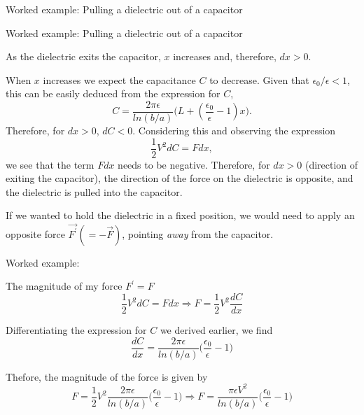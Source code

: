 {\begin{frame}{Worked example: Pulling a dielectric out of a capacitor}
\end{frame}

%
%
%

\begin{frame}{Worked example: Pulling a dielectric out of a capacitor}

  As the dielectric exits the capacitor, $x$ increases
  and, therefore, $dx > 0$.

  When $x$ increases we expect the capacitance $C$ to decrease.
  Given that $\epsilon_0/\epsilon < 1$,
  this can be easily deduced from the expression for $C$,
  \begin{equation*}
    C =
     \frac{2\pi \epsilon}{ln(b/a)}
         \Big(L + (\frac{\epsilon_0}{\epsilon}-1) x \Big).
  \end{equation*}
  Therefore, for $dx > 0$, $dC < 0$.
  Considering this and observing the expression
  \begin{equation*}
    \frac{1}{2}V^2 dC = F dx,
  \end{equation*}
  we see that the term $F dx$ needs to be negative.
  Therefore, for $dx > 0$ (direction of exiting the capacitor),
  the direction of the force on the dielectric is opposite,
  and the dielectric is pulled into the capacitor.

  If we wanted to hold the dielectric in a fixed position, we would
  need to apply an opposite force $\vec{F^\prime}(=-\vec{F})$,
  pointing {\em away} from the capacitor.

\end{frame}

%
%
%

\begin{frame}{Worked example: }

  The magnitude of my force $F^\prime=F$
  \begin{equation*}
    \frac{1}{2}V^2 dC = F dx \Rightarrow
    F = \frac{1}{2}V^2 \frac{dC}{dx}
  \end{equation*}

  Differentiating the expression for $C$ we derived earlier, we find
  \begin{equation*}
    \frac{dC}{dx} = \frac{2\pi \epsilon}{ln(b/a)}
        \Big(\frac{\epsilon_0}{\epsilon}-1\Big)
  \end{equation*}

  Thefore, the magnitude of the force is given by
  \begin{equation*}
    F = \frac{1}{2}V^2 \frac{2\pi \epsilon}{ln(b/a)}
     \Big(\frac{\epsilon_0}{\epsilon}-1\Big) \Rightarrow
    F = \frac{\pi \epsilon V^2}{ln(b/a)}
      \Big(\frac{\epsilon_0}{\epsilon}-1\Big)
  \end{equation*}

\end{frame}

} %
